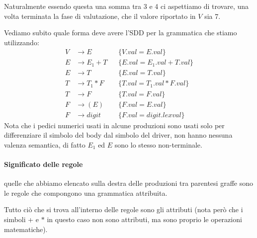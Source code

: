 \documentclass[class=book, crop=false, oneside, 12pt]{standalone}
\begin{document}
Naturalmente essendo questa una somma tra 3 e 4 ci aspettiamo di trovare, una volta terminata la fase di valutazione, che il valore riportato in \(V\) sia 7.

Vediamo subito quale forma deve avere l'SDD per la grammatica che stiamo utilizzando:
\begin{align}
    \label{reg:regola-1}
    V &\to E & &\{V.val = E.val\} \\
    \label{reg:regola-2}
    E &\to E_1 + T & &\{E.val = E_1.val + T.val\} \\
    \label{reg:regola-3}
    E &\to T & &\{E.val = T.val\} \\
    \label{reg:regola-4}
    T &\to T_1 * F & &\{T.val = T_1.val * F.val\} \\
    \label{reg:regola-5}
    T &\to F & &\{T.val = F.val\} \\
    \label{reg:regola-6}
    F &\to (E) & &\{F.val = E.val\} \\
    \label{reg:regola-7}
    F &\to digit & &\{F.val = digit.lexval\}
\end{align}
Nota che i pedici numerici usati in alcune produzioni sono usati solo per differenziare il simbolo del body dal simbolo del driver, non hanno nessuna valenza semantica, di fatto \(E_1\) ed \(E\) sono lo stesso non-terminale.

\paragraph*{Significato delle regole} quelle che abbiamo elencato sulla destra delle produzioni tra parentesi graffe sono le regole che compongono una grammatica attribuita.

\noindent Tutto ciò che si trova all'interno delle regole sono gli attributi (nota però che i simboli + e \(*\) in questo caso non sono attributi, ma sono proprio le operazioni matematiche).
\end{document}
